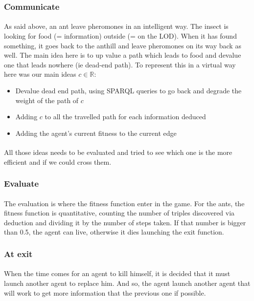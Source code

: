 \documentclass{article}
\newenvironment{itemh}[0]{\begin{itemize}[label=$\heartsuit$, font=\color{mygray} \small]}{\end{itemize}}
\begin{document}
		\subsubsection{Communicate}
			\paragraph{}
			As said above, an ant leave pheromones in an intelligent way.
			The insect is looking for food (= information) outside (= on the LOD).
			When it has found something, it goes back to the anthill and leave pheromones on its way back as well.
			The main idea here is to up value a path which leads to food and devalue one that leads nowhere (ie dead-end path).
			To represent this in a virtual way here was our main ideas $c \in \mathbb{R}$:
			\begin{itemh}
				\item Devalue dead end path, using SPARQL queries to go back and degrade the weight of the path of $c$
				\item Adding $c$ to all the travelled path for each information deduced
				\item Adding the agent's current fitness to the current edge
			\end{itemh}
			\paragraph{}
				All those ideas needs to be evaluated and tried to see which one is the more efficient and if we could cross them.
		\subsubsection{Evaluate}
			\paragraph{}
			The evaluation is where the fitness function enter in the game.
			For the ants, the fitness function is quantitative,
			counting the number of triples discovered via deduction and dividing it by the number of steps taken.
			If that number is bigger than 0.5, the agent can live, otherwise it dies launching the exit function.
		\subsubsection{At exit}
			\paragraph{}
			When the time comes for an agent to kill himself, it is decided that it must launch another agent to replace him.
			And so, the agent launch another agent that will work to get more information that the previous one if possible.
\end{document}
